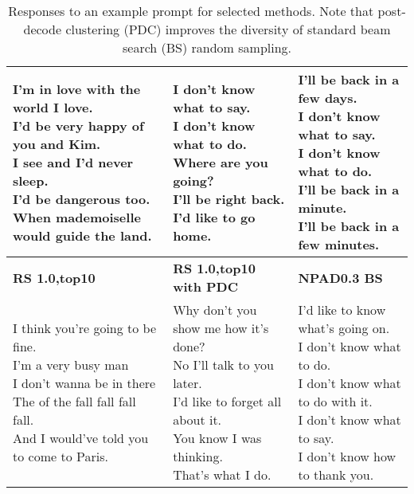 \documentclass[thesis.tex]{subfiles}
\begin{document}
\begin{table*}[t]
\begin{tabular}{|l|l|l|}
\makecell[l]{
I'm in love with the world I love.\\
I'd be very happy of you and Kim.\\
I see and I'd never sleep.\\
I'd be dangerous too.\\
\tiny When mademoiselle would guide the land.\\
}&
\makecell[l]{
I don't know what to say.\\
I don't know what to do.\\
Where are you going?\\
I'll be right back.\\
I'd like to go home.\\
}&
\makecell[l]{
I'll be back in a few days.\\
I don't know what to say.\\
I don't know what to do.\\
I'll be back in a minute.\\
I'll be back in a few minutes.\\
}
\\
    \hline
    \hline
    \footnotesize \textbf{RS 1.0,top10} & \footnotesize \textbf{RS 1.0,top10 with PDC} & \footnotesize  \textbf{NPAD0.3 BS} \\
    \hline
\makecell[l]{
I think you're going to be fine.\\
I'm a very busy man\\
I don't wanna be in there\\
The of the fall fall fall fall.\\
\tiny And I would've told you to come to Paris.\\
}&
\makecell[l]{
\tiny Why don't you show me how it's done?\\
No I'll talk to you later.\\
I'd like to forget all about it.\\
You know I was thinking.\\
That's what I do.\\
}
&
\makecell[l]{
I'd like to know what's going on.\\
I don't know what to do.\\
I don't know what to do with it.\\
I don't know what to say.\\
I don't know how to thank you.\\
}\\
\hline
    \end{tabular}
    \caption{Responses to an example prompt for selected methods. Note that post-decode clustering (PDC) improves the diversity of standard beam search (BS) random sampling.}
    \label{examples}
\end{table*}
\end{document}
